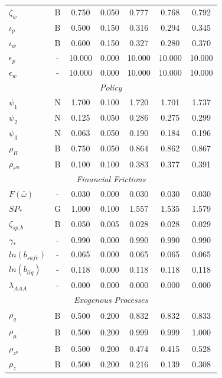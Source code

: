 \documentclass[12pt]{article}
\begin{document}
{\begin{longtable}{lcccccc}
$\zeta_w$ & B &    0.750 &    0.050 &    0.777 &    0.768 &    0.792 \\
$\iota_p$ & B &    0.500 &    0.150 &    0.316 &    0.294 &    0.345 \\
$\iota_w$ & B &    0.600 &    0.150 &    0.327 &    0.280 &    0.370 \\
$\epsilon_{p}$ & - &   10.000 &    0.000 &   10.000 &   10.000 &   10.000 \\
$\epsilon_{w}$ & - &   10.000 &    0.000 &   10.000 &   10.000 &   10.000 \\
\multicolumn{7}{c}{\textit{Policy}} \\[3pt]
$\psi_1$ & N &    1.700 &    0.100 &    1.720 &    1.701 &    1.737 \\
$\psi_2$ & N &    0.125 &    0.050 &    0.286 &    0.275 &    0.299 \\
$\psi_3$ & N &    0.063 &    0.050 &    0.190 &    0.184 &    0.196 \\
$\rho_R$ & B &    0.750 &    0.050 &    0.864 &    0.862 &    0.867 \\
$\rho_{r^m}$ & B &    0.100 &    0.100 &    0.383 &    0.377 &    0.391 \\
\multicolumn{7}{c}{\textit{Financial Frictions}} \\[3pt]
$F(\bar{\omega})$ & - &    0.030 &    0.000 &    0.030 &    0.030 &    0.030 \\
$SP_*$ & G &    1.000 &    0.100 &    1.557 &    1.535 &    1.579 \\
$\zeta_{sp,b}$ & B &    0.050 &    0.005 &    0.028 &    0.028 &    0.029 \\
$\gamma_*$ & - &    0.990 &    0.000 &    0.990 &    0.990 &    0.990 \\
$ln(b_{safe})$ & - &    0.065 &    0.000 &    0.065 &    0.065 &    0.065 \\
$ln(b_{liq})$ & - &    0.118 &    0.000 &    0.118 &    0.118 &    0.118 \\
$\lambda_{AAA}$ & - &    0.000 &    0.000 &    0.000 &    0.000 &    0.000 \\
\multicolumn{7}{c}{\textit{Exogenous Processes}} \\[3pt]
$\rho_g$ & B &    0.500 &    0.200 &    0.832 &    0.832 &    0.833 \\
$\rho_{\mu}$ & B &    0.500 &    0.200 &    0.999 &    0.999 &    1.000 \\
$\rho_{z^p}$ & B &    0.500 &    0.200 &    0.474 &    0.415 &    0.528 \\
$\rho_z$ & B &    0.500 &    0.200 &    0.216 &    0.139 &    0.308 \\

\end{longtable}}
\end{document}
